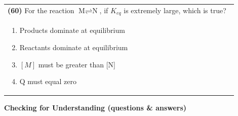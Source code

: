 \documentclass{article}
\begin{document}
\noindent\begin{tabular}{|p{0.9\linewidth}|}
\hline
\textbf{(60)} For the reaction $\text{M} \rightleftharpoons \text{N}$, if $K_{eq}$ is extremely large, which is true?\\[0.2cm]
\begin{minipage}[t]{0.85\linewidth}
\begin{enumerate}[label=\alph*.]
\item Products dominate at equilibrium
\item Reactants dominate at equilibrium
\item $[M]$ must be greater than [N]
\item Q must equal zero
\end{enumerate}
\end{minipage}\\[0.2cm]
\hline
\end{tabular}
\newpage
\noindent
{\large\textbf{Checking for Understanding (questions \& answers)}}\\
\end{document}
